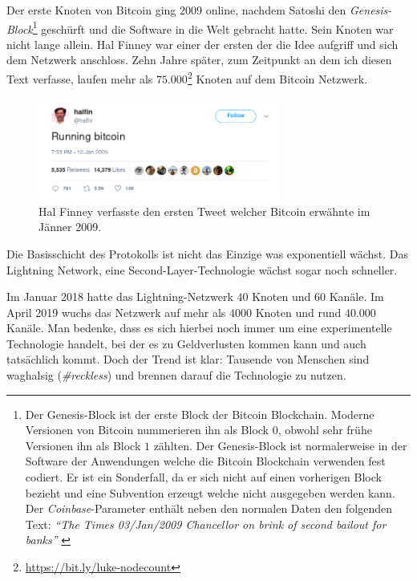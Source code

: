Der erste Knoten von Bitcoin ging 2009 online, nachdem Satoshi den
\textit{Genesis-Block}\footnote{ Der Genesis-Block ist der erste Block der
Bitcoin Blockchain. Moderne Versionen von Bitcoin nummerieren ihn als Block $0$,
obwohl sehr frühe Versionen ihn als Block $1$ zählten. Der Genesis-Block ist
normalerweise in der Software der Anwendungen welche die Bitcoin Blockchain
verwenden fest codiert.  Er ist ein Sonderfall, da er sich nicht auf einen
vorherigen Block bezieht und eine Subvention erzeugt welche nicht ausgegeben
werden kann. Der \textit{Coinbase}-Parameter enthält neben den normalen Daten
den folgenden Text: \textit{\enquote{The Times 03/Jan/2009 Chancellor on brink
of second bailout for banks}} \cite{btcwiki:genesis-block}} geschürft und die
Software in die Welt gebracht hatte. Sein Knoten war nicht lange allein. Hal
Finney war einer der ersten der die Idee aufgriff und sich dem Netzwerk
anschloss. Zehn Jahre später, zum Zeitpunkt an dem ich diesen Text verfasse,
laufen mehr als $75.000$\footnote{\url{https://bit.ly/luke-nodecount}} Knoten
auf dem Bitcoin Netzwerk.

\begin{figure}
  \centering
  \includegraphics[width=8cm]{assets/images/running-bitcoin.png}
  \caption{Hal Finney verfasste den ersten Tweet welcher Bitcoin erwähnte im
  Jänner 2009.}
  \label{fig:running-bitcoin}
\end{figure}

Die Basisschicht des Protokolls ist nicht das Einzige was exponentiell wächst.
Das Lightning Network, eine Second-Layer-Technologie wächst sogar noch
schneller.

Im Januar 2018 hatte das Lightning-Netzwerk $40$ Knoten und $60$ Kanäle. Im
April 2019 wuchs das Netzwerk auf mehr als $4000$ Knoten und rund $40.000$
Kanäle. Man bedenke, dass es sich hierbei noch immer um eine experimentelle
Technologie handelt, bei der es zu Geldverlusten kommen kann und auch
tatsächlich kommt. Doch der Trend ist klar: Tausende von Menschen sind
waghalsig (\textit{\#reckless}) und brennen darauf die Technologie zu nutzen.

